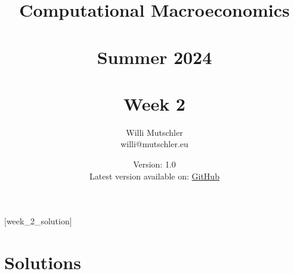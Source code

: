 
\newif\ifDisplaySolutions\DisplaySolutionstrue%


\title{Computational Macroeconomics\\~\\Summer 2024\\~\\Week 2}
\author{Willi Mutschler\\willi@mutschler.eu}
\date{Version: 1.0\\Latest version available on: \href{https://github.com/wmutschl/Computational-Macroeconomics/releases/latest/download/week_2.pdf}{GitHub}}
\maketitle\thispagestyle{empty}

\newpage
{}[week_2_solution]
\tableofcontents\thispagestyle{empty}\newpage

\setcounter{page}{1}
\newpage
\newpage
\newpage
\printbibliography%
\newpage

\ifDisplaySolutions%
\newpage
\appendix
\section{Solutions}

\fi
